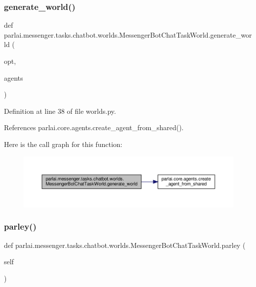 \subsubsection{\texorpdfstring{generate\+\_\+world()}{generate\_world()}}
{\footnotesize\ttfamily def parlai.\+messenger.\+tasks.\+chatbot.\+worlds.\+Messenger\+Bot\+Chat\+Task\+World.\+generate\+\_\+world (\begin{DoxyParamCaption}\item[{}]{opt,  }\item[{}]{agents }\end{DoxyParamCaption})\hspace{0.3cm}{\ttfamily [static]}}



Definition at line 38 of file worlds.\+py.



References parlai.\+core.\+agents.\+create\+\_\+agent\+\_\+from\+\_\+shared().

Here is the call graph for this function\+:
\nopagebreak
\begin{figure}[H]
\begin{center}
\leavevmode
\includegraphics[width=350pt]{classparlai_1_1messenger_1_1tasks_1_1chatbot_1_1worlds_1_1MessengerBotChatTaskWorld_a157b8abe4ccd3162acf89440b0cb2bfb_cgraph}
\end{center}
\end{figure}
\mbox{\label{classparlai_1_1messenger_1_1tasks_1_1chatbot_1_1worlds_1_1MessengerBotChatTaskWorld_aa6fca182a348aaeefda3a63358ba5575}} 
\subsubsection{\texorpdfstring{parley()}{parley()}}
{\footnotesize\ttfamily def parlai.\+messenger.\+tasks.\+chatbot.\+worlds.\+Messenger\+Bot\+Chat\+Task\+World.\+parley (\begin{DoxyParamCaption}\item[{}]{self }\end{DoxyParamCaption})}



